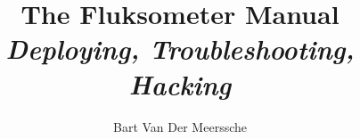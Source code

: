 


\title{
    The Fluksometer Manual\\
    \textit{Deploying, Troubleshooting, Hacking}\\
}
\author{Bart Van Der Meerssche}
\date{\DATE}



\frontmatter

\maketitle

\tableofcontents



\mainmatter




%
%
%

\appendix


